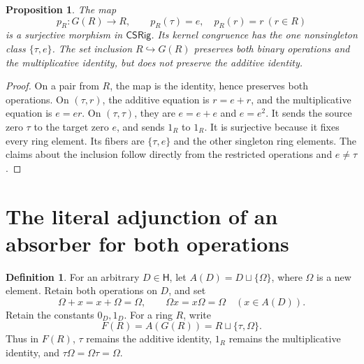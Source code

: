\documentclass[11pt]{article}
\newtheorem{proposition}[theorem]{Proposition}
\theoremstyle{definition}
\newtheorem{definition}[theorem]{Definition}
\newcommand{\HH}{\mathsf H}
\newcommand{\SSS}{\mathsf{CSRig}}
\newcommand{\Om}{\Omega}
\begin{document}
\begin{proposition}\label{prop:ringprojection}
The map
\[
 p_R:G(R)\longrightarrow R,\qquad p_R(\tau)=e,\quad p_R(r)=r\ (r\in R)
\tag{2}\label{eq:ringprojection}
\]
is a surjective morphism in \(\SSS\). Its kernel congruence has the one
nonsingleton class \(\{\tau,e\}\). The set inclusion \(R\hookrightarrow
G(R)\) preserves both binary operations and the multiplicative identity,
but does not preserve the additive identity.
\end{proposition}
\begin{proof}
On a pair from \(R\), the map is the identity, hence preserves both
operations. On \((\tau,r)\), the additive equation is \(r=e+r\),
and the multiplicative equation is \(e=er\). On \((\tau,\tau)\),
they are \(e=e+e\) and \(e=e^2\). It sends the source zero \(\tau\)
to the target zero \(e\), and sends \(1_R\) to \(1_R\).
It is surjective because it fixes every ring element. Its fibers are
\(\{\tau,e\}\) and the other singleton ring elements. The claims about
the inclusion follow directly from the restricted operations and
\(e\ne\tau\).
\end{proof}

\section{The literal adjunction of an absorber for both operations}

\begin{definition}\label{def:A}
For an arbitrary \(D\in\HH\), let \(A(D)=D\sqcup\{\Om\}\), where
\(\Om\) is a new element. Retain both operations on \(D\), and set
\[
 \Om+x=x+\Om=\Om,\qquad \Om x=x\Om=\Om\quad(x\in A(D)).
\tag{3}\label{eq:literal}
\]
Retain the constants \(0_D,1_D\). For a ring \(R\), write
\[
 F(R)=A(G(R))=R\sqcup\{\tau,\Om\}.
\]
Thus in \(F(R)\), \(\tau\) remains the additive identity,
\(1_R\) remains the multiplicative identity, and
\(\tau\Om=\Om\tau=\Om\).
\end{definition}
\end{document}
